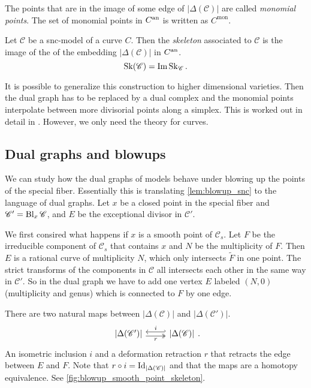 \begin{definition}
	The points that are in the image of some edge of $|\Delta(\mathscr C)|$ are called \emph{monomial points}. 
	The set of monomial points in $C{}^{\text{an}}$ is written as  $C^{\text{mon}}$. 
\end{definition}
\begin{definition}
	Let $\mathscr C$ be a snc-model of a curve $C$. 
	Then the \emph{skeleton} associated to $\mathscr C$ is the image of the of the embedding $|\Delta(\mathscr C)|$ in $C{}^{\text{an}}$. 
	\[
		\operatorname{Sk}(\mathscr C) = \operatorname{Im} \operatorname{Sk}_{\mathscr C}
	.\] 
\end{definition}

\begin{remark}
	It is possible to generalize this construction to higher dimensional varieties. 
	Then the dual graph has to be replaced by a dual complex and the monomial points interpolate between more divisorial points along a simplex.
	This is worked out in detail in \cite{mustataWeightFunctionsNonArchimedean2015}. 
	However, we only need the theory for curves. 
\end{remark}


\subsection{Dual graphs and blowups} \label{sec:dual_graphs_and_blowups}
We can study how the dual graphs of models behave under blowing up the points of the special fiber.
Essentially this is translating \cref{lem:blowup_snc} to the language of dual graphs.
Let $x$ be a closed point in the special fiber and $\mathscr C' = \operatorname{Bl}_{x} \mathscr C$, and $E$ be the exceptional divisor in $\mathscr C'$.

We first consired what happens if $x $ is a smooth point of $\mathscr C_s$. 
Let $F$ be the irreducible component of $\mathscr C_s$ that contains $x$ and $N$ be the multiplicity of $F$. 
Then $E$ is a rational curve of multiplicity $N$, which only intersects $\tilde F$ in one point. 
The strict transforms of the components in $\mathscr C$ all intersects each other in the same way in $\mathscr C'$. 
So in the dual graph we have to add one vertex $E$ labeled $(N, 0)$ (multiplicity and genus) which is connected to $F$ by one edge.

There are two natural maps between $|\Delta(\mathscr C)|$ and $|\Delta(\mathscr C')|$. 
\[
\begin{tikzcd}
	{|\Delta(\mathscr C')|} \rar[hookleftarrow, shift left]{i} \rar[twoheadrightarrow, shift right, ']{r} & {|\Delta(\mathscr C)|} 
\end{tikzcd}
.\] 
An isometric inclusion $i$ and a deformation retraction $r$ that retracts the edge between  $E$ and $F$. 
Note that $r \circ i = \operatorname{Id}_{|\Delta(\mathscr C)|}$ and that the maps are a homotopy equivalence. 
See \cref{fig:blowup_smooth_point_skeleton}. 

